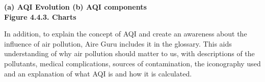\begin{center}
    \bf{ (a) AQI Evolution     (b) AQI components   \\
    Figure 4.4.3. Charts}
\end{center}
In addition, to explain the concept of AQI and create an awareness about the influence of air pollution, Aire Guru includes it in the
glossary. This aids understanding of why air pollution should matter to us, with descriptions of the pollutants, medical complications, sources of contamination, the iconography used and
an explanation of what AQI is and how it is calculated. \\